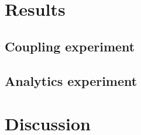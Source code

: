 \documentclass[prodmode,acmtochi]{acmsmall} %
\begin{document}
\pagebreak

\section{Results}

\subsection{Coupling experiment}



\subsection{Analytics experiment}






\pagebreak


\section{Discussion}









	
\end{document}
